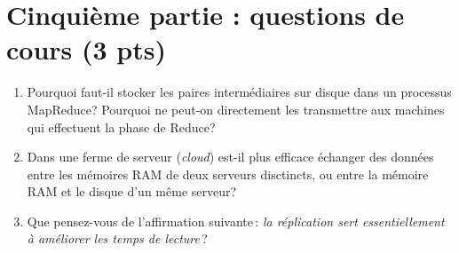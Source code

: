 \documentclass[11pt,a4paper]{article}
\begin{document}
\section*{Cinquième partie : questions de cours (3 pts)}

\begin{enumerate}
 \item Pourquoi faut-il stocker les paires intermédiaires sur disque dans un processus
 MapReduce? Pourquoi ne peut-on directement les transmettre aux machines qui effectuent
 la phase de Reduce?
 
\item Dans une ferme de serveur (\textit{cloud}) est-il plus efficace échanger des données
   entre les mémoires RAM de deux serveurs disctincts, ou entre la mémoire RAM et le disque d'un même serveur?
  
      \item Que pensez-vous de l'affirmation suivante\,: \emph{la réplication sert essentiellement
        à améliorer les temps de lecture}\,?
    
\end{enumerate}
\end{document}
